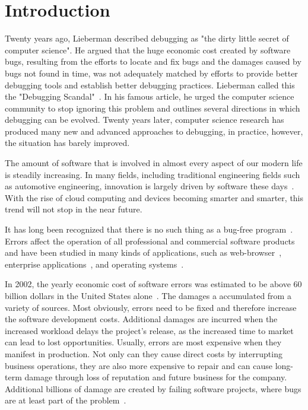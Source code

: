 \chapter{Introduction}
\label{sec:introduction}

Twenty years ago, Lieberman described debugging as "the dirty little secret of computer science".
He argued that the huge economic cost created by software bugs, resulting from the efforts to locate and fix bugs and the damages caused by bugs  not found in time, was not adequately matched by efforts to provide better debugging tools and establish better debugging practices.
Lieberman called this the "Debugging Scandal"~\cite{lieberman97:the_debugging_scandal}.
In his famous article, he urged the computer science community to stop ignoring this problem and outlines several directions in which debugging can be evolved.
Twenty years later, computer science research has produced many new and advanced approaches to debugging, in practice, however, the situation has barely improved.

The amount of software that is involved in almost every aspect of our modern life is steadily increasing.
In many fields, including traditional engineering fields such as automotive engineering, innovation is largely driven by software these days~\cite{evans08:invisible_engines_how_software, gorschek10:a_lightweight_innovation_process}.
With the rise of cloud computing and devices becoming smarter and smarter, this trend will not stop in the near future.

It has long been recognized that there is no such thing as a bug-free program~\cite{schwartz71:an_overview_of_bugs}.
Errors affect the operation of all professional and commercial software products and have been studied in many kinds of applications, such as web-browser~\cite{li06:have_things_changed_now}, enterprise applications~\cite{turhan09:data_mining_source_code, sahoo10:an_empirical_study}, and operating systems~\cite{guo10:characterizing_and_predicting_which}. %

In 2002, the yearly economic cost of software errors was estimated to be above 60 billion dollars in the United States alone~\cite{tassey02:the_economic_impacts}. 
The damages a accumulated from a variety of sources.
Most obviously, errors need to be fixed and therefore increase the software development costs.
Additional damages are incurred when the increased workload delays the project's release, as the increased time to market can lead to lost opportunities.
Usually, errors are most expensive when they manifest in production.
Not only can they cause direct costs by interrupting business operations, they are also more expensive to repair and can cause long-term damage through loss of reputation and future business for the company.
Additional billions of damage are created by failing software projects, where bugs are at least part of the problem~\cite{charette05:why_software_fails}.

